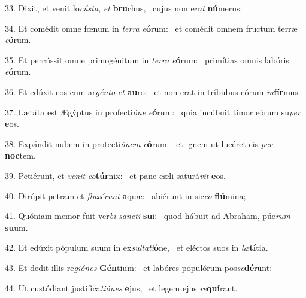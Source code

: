 33. Dixit, et venit lo\textit{cús}\textit{ta}, \textit{et} \textbf{bru}chus, \ast\  cujus non e\textit{rat} \textbf{nú}merus:\

34. Et comédit omne fœnum in \textit{ter}\textit{ra} \textit{e}\textbf{ó}rum: \ast\  et comédit omnem fructum terræ \textit{e}\textbf{ó}rum.\

35. Et percússit omne primogénitum in \textit{ter}\textit{ra} \textit{e}\textbf{ó}rum: \ast\  primítias omnis labóris \textit{e}\textbf{ó}rum.\

36. Et edúxit eos cum ar\textit{gén}\textit{to} \textit{et} \textbf{au}ro: \ast\  et non erat in tríbubus eórum \textit{in}\textbf{fír}mus.\

37. Lætáta est Ægýptus in profecti\textit{ó}\textit{ne} \textit{e}\textbf{ó}rum: \ast\  quia incúbuit timor eórum su\textit{per} \textbf{e}os.\

38. Expándit nubem in protecti\textit{ó}\textit{nem} \textit{e}\textbf{ó}rum: \ast\  et ignem ut lucéret eis \textit{per} \textbf{noc}tem.\

39. Petiérunt, et \textit{ve}\textit{nit} \textit{co}\textbf{túr}nix: \ast\  et pane cæli saturá\textit{vit} \textbf{e}os.\

40. Dirúpit petram et \textit{flu}\textit{xé}\textit{runt} \textbf{a}quæ: \ast\  abiérunt in sic\textit{co} \textbf{flú}mina;\

41. Quóniam memor fuit ver\textit{bi} \textit{sanc}\textit{ti} \textbf{su}i: \ast\  quod hábuit ad Abraham, púe\textit{rum} \textbf{su}um.\

42. Et edúxit pópulum suum in ex\textit{sul}\textit{ta}\textit{ti}\textbf{ó}ne, \ast\  et eléctos suos in \textit{læ}\textbf{tí}tia.\

43. Et dedit illis re\textit{gi}\textit{ó}\textit{nes} \textbf{Gén}tium: \ast\  et labóres populórum pos\textit{se}\textbf{dé}runt:\

44. Ut custódiant justifica\textit{ti}\textit{ó}\textit{nes} \textbf{e}jus, \ast\  et legem ejus \textit{re}\textbf{quí}rant.\

